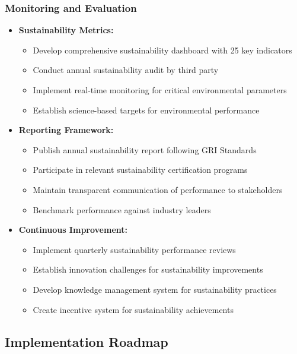 \subsubsection{Monitoring and Evaluation}
\begin{itemize}
    \item \textbf{Sustainability Metrics:}
    \begin{itemize}
        \item Develop comprehensive sustainability dashboard with 25 key indicators
        \item Conduct annual sustainability audit by third party
        \item Implement real-time monitoring for critical environmental parameters
        \item Establish science-based targets for environmental performance
    \end{itemize}
    
    \item \textbf{Reporting Framework:}
    \begin{itemize}
        \item Publish annual sustainability report following GRI Standards
        \item Participate in relevant sustainability certification programs
        \item Maintain transparent communication of performance to stakeholders
        \item Benchmark performance against industry leaders
    \end{itemize}
    
    \item \textbf{Continuous Improvement:}
    \begin{itemize}
        \item Implement quarterly sustainability performance reviews
        \item Establish innovation challenges for sustainability improvements
        \item Develop knowledge management system for sustainability practices
        \item Create incentive system for sustainability achievements
    \end{itemize}
\end{itemize}

\subsection{Implementation Roadmap}

